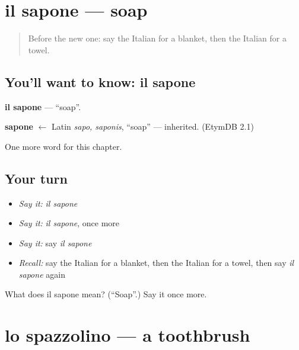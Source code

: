 \section[il sapone]{il sapone — soap}

\label{lesson:IT-C96-sapone}



\begin{quote}
Before the new one: say the Italian for a blanket, then the Italian for a towel.
\end{quote}

\subsection*{You'll want to know: il sapone}
\textbf{il sapone} — \textquotedblleft{}soap\textquotedblright{}.

\begin{cousinweb}
\textbf{sapone} $\leftarrow$ Latin \emph{sapo, saponis}, \textquotedblleft{}soap\textquotedblright{} — inherited. (EtymDB 2.1)
\end{cousinweb}

\begin{grammarlens}[title={What you've built}]
One more word for this chapter.
\end{grammarlens}

\subsection*{Your turn}
\begin{itemize}
\raggedright
  \item \emph{Say it:} \emph{il sapone}
  \item \emph{Say it:} \emph{il sapone}, once more
  \item \emph{Say it:} say \emph{il sapone}
  \item \emph{Recall:} say the Italian for a blanket, then the Italian for a towel, then say \emph{il sapone} again
\end{itemize}

\begin{tcolorbox}[breakable,colback=teal!4,colframe=teal!35!black,title={Before you move on}]
What does il sapone mean? (\textquotedblleft{}Soap\textquotedblright{}.) Say it once more.
\end{tcolorbox}
\section[lo spazzolino]{lo spazzolino — a toothbrush}

